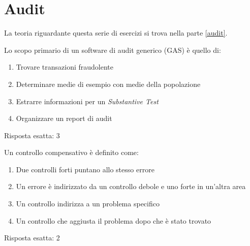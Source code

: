 \chapter{Audit}
\label{EsAudit}

La teoria riguardante questa serie di esercizi si trova nella
parte \ref{audit}.

\begin{Exercise} [
  title={Quiz},
  label={audit1}
  ]

  \Question Lo scopo primario di un software di audit generico (GAS) è quello 
di:
\begin{enumerate}
 \item Trovare transazioni fraudolente
 \item Determinare medie di esempio con medie della popolazione
 \item Estrarre informazioni per un \textit{Substantive Test}
 \item Organizzare un report di audit
\end{enumerate}

\end{Exercise}


\begin{Answer} [
  ref={audit1},
  number={1}
  ]

  \Question Risposta esatta: 3

\end{Answer}


\begin{Exercise} [
  title={Quiz},
  label={audit2}
  ]

  \Question Un controllo compensativo è definito come:
  \begin{enumerate}
   \item Due controlli forti puntano allo stesso errore
   \item Un errore è indirizzato da un controllo debole e uno forte in un'altra 
area
   \item Un controllo indirizza a un problema specifico
   \item Un controllo che aggiusta il problema dopo che è stato trovato
  \end{enumerate}

\end{Exercise}


\begin{Answer} [
  ref={audit2},
  number={2}
  ]

  \Question Risposta esatta: 2

\end{Answer}


